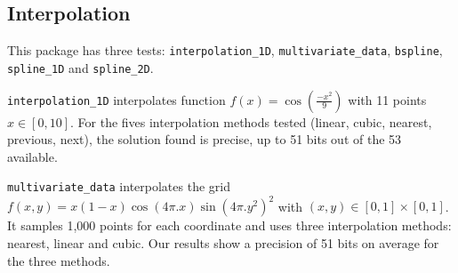 \documentclass[11pt]{article}
\begin{document}


\subsection{Interpolation}

This package has three tests: \texttt{interpolation\_1D}, \texttt{multivariate\_data}, \texttt{bspline}, \texttt{spline\_1D} and \texttt{spline\_2D}.

\texttt{interpolation\_1D} interpolates function $f(x)=\cos(\frac{-x^2}{9})$ with 11 points $x\in[0,10]$.
For the fives interpolation methods tested (linear, cubic, nearest, previous, next), the solution found is precise, up to 51 bits out of the 53 available.

\texttt{multivariate\_data} interpolates the grid $f(x,y)=x(1-x)\cos(4\pi.x)  \sin(4\pi.y^2)^2$ with $(x,y) \in [0,1] \times [0,1]$. It samples 1,000 points for each coordinate and uses three interpolation methods: nearest, linear and cubic. Our results show a precision of 51 bits on average for the three methods. 
\end{document}
